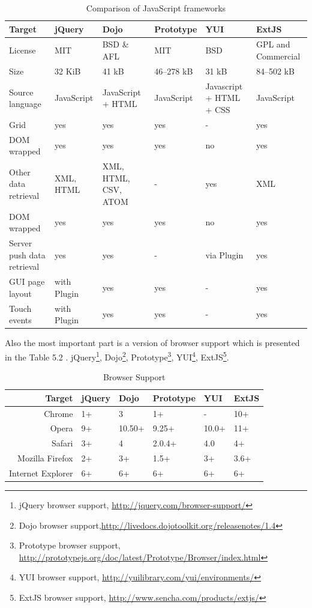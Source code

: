 	\begin{table}[H]
	\centering
	\begin{tabular}{|L{3cm}|l|L{2cm}|l|L{2cm}|L{2cm}|}
	\hline
	Target 			& jQuery & Dojo & Prototype & YUI & ExtJS \\
	\hline
	\hline
	License		& MIT & BSD \& AFL & MIT & BSD & GPL and Commercial \\
	\hline
	Size		& 32 KiB & 41 kB & 46–278 kB & 31 kB & 84–502 kB \\
	\hline
	Source language		& JavaScript & JavaScript + HTML & JavaScript &  Javascript + HTML + CSS & JavaScript \\
	\hline
	Grid		& yes & yes & yes & - & yes  \\
	\hline
	DOM wrapped		& yes & yes & yes & no & yes \\
	\hline
	Other data retrieval		& XML, HTML & XML, HTML, CSV, ATOM & - & yes & XML  \\
	\hline
	DOM wrapped		& yes & yes & yes & no & yes \\
	\hline
	Server push data retrieval		& yes & yes & - & via Plugin & yes \\
	\hline
	GUI page layout		& with Plugin & yes & yes & - & yes \\
	\hline 		
	Touch events		& with Plugin & yes & yes & - & yes \\
	\hline 
	\end{tabular}
	\caption[Caption in TOC]{Comparison of JavaScript frameworks}
	\label{tab:JS_frameworks}
	\end{table}
	Also the most important part is a version of browser support which is presented in the Table 5.2 . jQuery\footnote{jQuery browser support, \url{http://jquery.com/browser-support/}}, Dojo\footnote{Dojo browser support,\url{http://livedocs.dojotoolkit.org/releasenotes/1.4}}, Prototype\footnote{Prototype browser support, \url{http://prototypejs.org/doc/latest/Prototype/Browser/index.html}}, YUI\footnote{YUI browser support, \url{http://yuilibrary.com/yui/environments/}}, ExtJS\footnote{ExtJS browser support, \url{http://www.sencha.com/products/extjs/}}.

	\begin{table}[H]
	\centering
	\begin{tabular}{|r|l|l|l|l|l|}
	\hline
	Target 			& jQuery & Dojo & Prototype & YUI & ExtJS \\
	\hline
	\hline
	Chrome		& 1+ & 3 & 1+ & - & 10+ \\
	\hline
	Opera		& 9+ & 10.50+ & 9.25+ & 10.0+ & 11+ \\
	\hline
	Safari		& 3+ & 4 & 2.0.4+ & 4.0 & 4+ \\
	\hline
	Mozilla Firefox		& 2+ & 3+ & 1.5+ & 3+ & 3.6+ \\
	\hline
	Internet Explorer		& 6+ & 6+ & 6+ & 6+ & 6+ \\
	\hline
	\end{tabular}
	\caption[Caption in TOC]{Browser Support}
	\label{tab:internal_results}
	\end{table}
    
